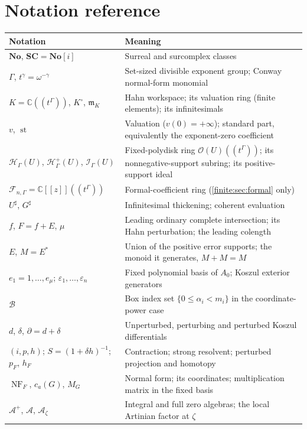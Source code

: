 \documentclass[11pt,letterpaper]{article}
\theoremstyle{definition}
\theoremstyle{remark}
\newcommand{\No}{\mathbf{No}}
\newcommand{\SC}{\mathbf{SC}}
\newcommand{\C}{\mathbb C}
\newcommand{\OO}{\mathcal O}
\newcommand{\HH}{\mathscr H}
\newcommand{\Hp}{\mathscr H^{+}}
\newcommand{\Ip}{\mathscr I}
\newcommand{\Af}{\mathscr F}
\newcommand{\Alg}{\mathcal A}
\newcommand{\mm}{\mathfrak m}
\newcommand{\Kc}{K^{\circ}}
\newcommand{\sh}{^{\sharp}}
\newcommand{\bx}{\mathcal B}
\DeclareMathOperator{\st}{st}
\DeclareMathOperator{\NF}{NF}
\numberwithin{equation}{section}
\begin{document}
\section{Notation reference}
\label{finite:app:notation}

\begin{center}\small
\begin{longtable}{@{}L{0.26\textwidth}L{0.66\textwidth}@{}}
\toprule
Notation & Meaning\\
\midrule
\endhead
$\No$, $\SC=\No[i]$ & Surreal and surcomplex classes\\[0.25em]
$\Gamma$, $t^\gamma=\omega^{-\gamma}$ & Set-sized divisible exponent group; Conway normal-form monomial\\[0.25em]
$K=\C((t^\Gamma))$, $\Kc$, $\mm_K$ & Hahn workspace; its valuation ring (finite elements); its infinitesimals\\[0.25em]
$v$, $\st$ & Valuation ($v(0)=+\infty$); standard part, equivalently the exponent-zero coefficient\\[0.25em]
$\HH_\Gamma(U)$, $\Hp_\Gamma(U)$, $\Ip_\Gamma(U)$ & Fixed-polydisk ring $\OO(U)((t^\Gamma))$; its nonnegative-support subring; its positive-support ideal\\[0.25em]
$\Af_{n,\Gamma}=\C[[z]]((t^\Gamma))$ & Formal-coefficient ring (\cref{finite:sec:formal} only)\\[0.25em]
$U\sh$, $G\sh$ & Infinitesimal thickening; coherent evaluation\\[0.25em]
$f$, $F=f+E$, $\mu$ & Leading ordinary complete intersection; its Hahn perturbation; the leading colength\\[0.25em]
$E$, $M=E^*$ & Union of the positive error supports; the monoid it generates, $M+M=M$\\[0.25em]
$e_1=1,\ldots,e_\mu$; $\varepsilon_1,\ldots,\varepsilon_n$ & Fixed polynomial basis of $A_0$; Koszul exterior generators\\[0.25em]
$\bx$ & Box index set $\{0\leq\alpha_i<m_i\}$ in the coordinate-power case\\[0.25em]
$d$, $\delta$, $\partial=d+\delta$ & Unperturbed, perturbing and perturbed Koszul differentials\\[0.25em]
$(i,p,h)$; $S=(1+\delta h)^{-1}$; $p_F$, $h_F$ & Contraction; strong resolvent; perturbed projection and homotopy\\[0.25em]
$\NF_F$, $c_a(G)$, $M_G$ & Normal form; its coordinates; multiplication matrix in the fixed basis\\[0.25em]
$\Alg^+$, $\Alg$, $\Alg_\zeta$ & Integral and full zero algebras; the local Artinian factor at $\zeta$\\[0.25em]

\end{longtable}
\end{center}
\end{document}
